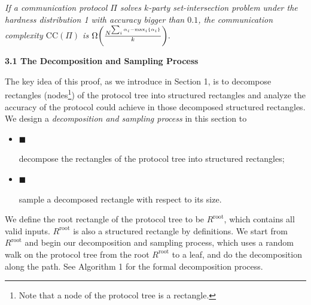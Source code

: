 \documentclass[10pt,a4paper]{article}
\begin{document}
\emph{If a communication protocol $\Pi$ solves $k$-party set-intersection problem under the hardness distribution 1 with accuracy bigger than $0.1$, the communication complexity $\text{CC}(\Pi)$ is $\Omega\bigg{(}\frac{N^{\sum_{i}\alpha_{i}-\mathop{\max}_{i}\{\alpha_{i}\}}}{k}\bigg{)}.$}\par






\par\medskip\noindent\textbf{
3.1 The Decomposition and Sampling Process}\par




The key idea of this proof, as we introduce in Section 1, is to decompose rectangles (nodes\footnote{Note that a node of the protocol tree is a rectangle.}) of the protocol tree into structured rectangles and analyze the accuracy of the protocol could achieve in those decomposed structured rectangles. We design a \emph{decomposition and sampling process} in this section to\par


\begin{itemize}


\item[] 
$\blacksquare$ 


decompose the rectangles of the protocol tree into structured rectangles;\par





\item[] 
$\blacksquare$ 


sample a decomposed rectangle with respect to its size.\par





\end{itemize}


We define the root rectangle of the protocol tree to be $R^{\text{root}}$, which contains all valid inputs. $R^{\text{root}}$ is also a structured rectangle by definitions. We start from $R^{\text{root}}$ and begin our decomposition and sampling process, which uses a random walk on the protocol tree from the root $R^{\text{root}}$ to a leaf, and do the decomposition along the path. See Algorithm 1 for the formal decomposition process.\par
\end{document}

